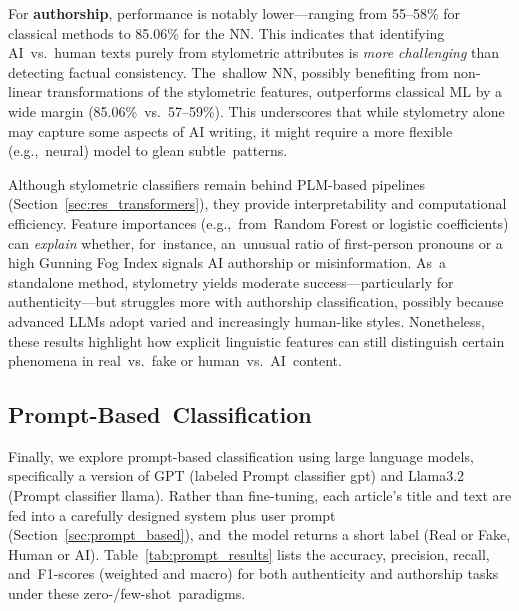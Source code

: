 \documentclass[electronics,article,accept,pdftex,moreauthors,electronics]{Definitions/mdpi}
\begin{document}
For \textbf{authorship}, performance is notably lower---ranging from 55--58\% for classical methods to 85.06\% for the NN. This indicates that identifying AI~vs.~human texts purely from stylometric attributes is \emph{more challenging} than detecting factual consistency. The~shallow NN, possibly benefiting from non-linear transformations of the stylometric features, outperforms classical ML by a wide margin (85.06\%~vs.~57--59\%). This underscores that while stylometry alone may capture some aspects of AI writing, it might require a more flexible (e.g.,~neural) model to glean subtle~patterns.


Although stylometric classifiers remain behind PLM-based pipelines (Section~\ref{sec:res_transformers}), they provide interpretability and computational efficiency. Feature importances (e.g.,~from~Random Forest or logistic coefficients) can \emph{explain} whether, for~instance, an~unusual ratio of first-person pronouns or a high Gunning Fog Index signals AI authorship or misinformation. As~a standalone method, stylometry yields moderate success---particularly for authenticity---but struggles more with authorship classification, possibly because advanced LLMs adopt varied and increasingly human-like styles. Nonetheless, these results highlight how explicit linguistic features can still distinguish certain phenomena in real~vs.~fake or human~vs.~AI~content.


\subsection{Prompt-Based~Classification}
\label{sec:res_prompt}

Finally, we explore prompt-based classification using large language models, specifically a version of GPT (labeled Prompt classifier gpt) and Llama3.2 (Prompt classifier llama). Rather than fine-tuning, each article’s title and text are fed into a carefully designed system plus user prompt (Section~\ref{sec:prompt_based}), and~the model returns a short label (Real or Fake, Human or AI). Table~\ref{tab:prompt_results} lists the accuracy, precision, recall, and~F1-scores (weighted and macro) for both authenticity and authorship tasks under these zero-/few-shot~paradigms.
\end{document}
